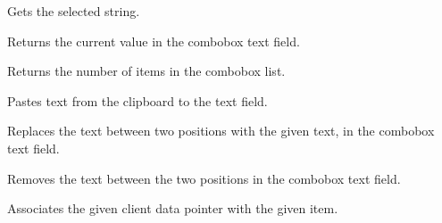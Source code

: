 Gets the selected string.

\label{wxcomboboxgetvalue}


Returns the current value in the combobox text field.

\label{wxcomboboxnumber}


Returns the number of items in the combobox list.

\label{wxcomboboxpaste}


Pastes text from the clipboard to the text field.

\label{wxcomboboxreplace}


Replaces the text between two positions with the given text, in the combobox text field.





\label{wxcomboboxremove}


Removes the text between the two positions in the combobox text field.




\label{wxcomboboxsetclientdata}


Associates the given client data pointer with the given item.




